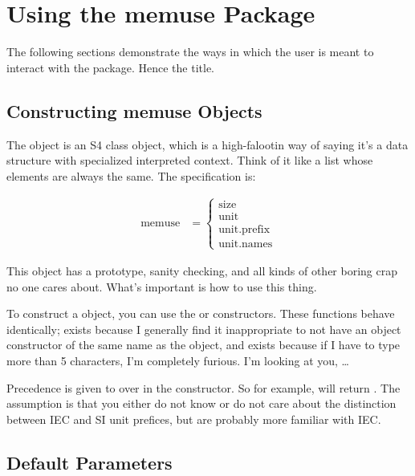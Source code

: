 \section{Using the memuse Package}

The following sections demonstrate the ways in which the user is meant to interact with the  package.  Hence the title.


\subsection{Constructing memuse Objects}

The  object is an S4 class object, which is a high-falootin way of saying it's a data structure with specialized interpreted context.  Think of it like a list whose elements are always the same.  The specification is:

\begin{align*}
  \text{memuse} &= 
  \begin{cases}
    \text{size}\\
    \text{unit}\\
    \text{unit.prefix}\\
    \text{unit.names}
  \end{cases}
\end{align*}

This object has a prototype, sanity checking, and all kinds of other boring crap no one cares about.  What's important is how to use this thing.

To construct a  object, you can use the  or  constructors.  These functions behave identically;  exists because I generally find it inappropriate to not have an object constructor of the same name as the object, and  exists because if I have to type more than 5 characters, I'm completely furious.  I'm looking at you, \dots

Precedence is given to  over  in the constructor.  So for example,  will return .  The assumption is that you either do not know or do not care about the distinction between IEC and SI unit prefices, but are probably more familiar with IEC.



\subsection{Default Parameters}


